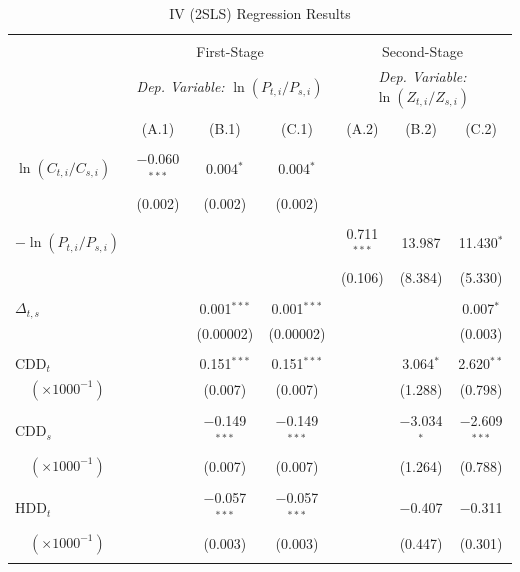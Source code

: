 \documentclass[11pt,a4paper]{extarticle}
\begin{document}
\begin{table}[!t] \centering 
	\caption{IV (2SLS) Regression Results}
	\label{table:2} 
	\small
	\begin{tabular}{@{\extracolsep{4pt}}lcccccc} 
		\\[-4ex]\hline  
		\hline \\[-1.6ex] 
		& \multicolumn{3}{c}{First-Stage} & \multicolumn{3}{c}{Second-Stage} \\ [0.5ex]
		& \multicolumn{3}{c}{\textit{Dep. Variable:} $\ln (P_{t,i} / P_{s,i})$ } & \multicolumn{3}{c}{\textit{Dep. Variable:}  $\ln (Z_{ t, i} / Z_{ s, i})$}\\ [0.5ex]
		\cmidrule(lr){2-4} \cmidrule(lr){5-7}\\[-2.2ex] 
		& (A.1) & (B.1) & (C.1) & (A.2) & (B.2) & (C.2)\\ [0.5ex]
		\hline \\[-1.8ex] 
		$ \ln (C_{t,i} / C_{s,i})$ & $-$0.060$^{***}$ & 0.004$^{*}$ & 0.004$^{*}$ &  &  &  \\ 
		& (0.002) & (0.002) & (0.002) &  &  &  \\ 
		& & & & & & \\ 
		$-\ln (P_{t,i} / P_{s,i})$ &  &  &  & 0.711$^{***}$ & 13.987 & 11.430$^{*}$ \\ 
		&  &  &  & (0.106) & (8.384) & (5.330) \\ 
		& & & & & & \\ 
		$\Delta_{t,s}$  &  & 0.001$^{***}$ & 0.001$^{***}$ &  &  & 0.007$^{*}$ \\ 
		&  & (0.00002) & (0.00002) &  &  & (0.003) \\ 
		& & & & & & \\ 
		CDD$_t$  &  & 0.151$^{***}$ & 0.151$^{***}$ &  & 3.064$^{*}$ & 2.620$^{**}$ \\ 
		$\quad(\times 1000^{-1})$&  & (0.007) & (0.007) &  & (1.288) & (0.798) \\ 
		& & & & & & \\ 
		CDD$_s$  &  & $-$0.149$^{***}$ & $-$0.149$^{***}$ &  & $-$3.034$^{*}$ & $-$2.609$^{***}$ \\ 
		$\quad(\times 1000^{-1})$&  & (0.007) & (0.007) &  & (1.264) & (0.788) \\ 
		& & & & & & \\ 
		HDD$_t$  &  & $-$0.057$^{***}$ & $-$0.057$^{***}$ &  & $-$0.407 & $-$0.311 \\ 
		$\quad(\times 1000^{-1})$&  & (0.003) & (0.003) &  & (0.447) & (0.301) \\ 
		& & & & & & \\ 

\end{tabular}
\end{table}
\end{document}
